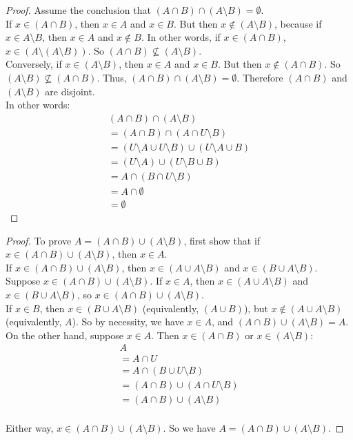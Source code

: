 \documentclass[12pt]{scrartcl} %
\begin{document}
\begin{proof}
Assume the conclusion that $(A \cap B) \cap (A\setminus B) = \emptyset$. \\
If $x \in (A \cap B)$, then $x \in A$ and $x \in B$. But then $x \notin (A \setminus B)$, because if $x \in A \setminus B$, then $x \in A$ and $x \notin B$. In other words, if $x \in (A \cap B)$, $x \in (A \setminus (A \setminus B))$. So $(A \cap B) \nsubseteq (A \setminus B)$. \\
Conversely, if $x \in (A\setminus B)$, then $x \in A$ and $x \in B$. But then $x \notin (A \cap B)$. So $(A\setminus B) \nsubseteq (A \cap B)$. Thus, $(A \cap B) \cap (A\setminus B) = \emptyset$. Therefore $(A \cap B)$ and  $(A\setminus B)$ are disjoint. \\
In other words:
\begin{align}
(A \cap B) \cap (A\setminus B) \\
= (A \cap B) \cap (A \cap U\setminus B) \\
= (U\setminus A \cup U\setminus B) \cup (U\setminus A \cup B) \\
= (U\setminus A) \cup (U\setminus B \cup B) \\
= A \cap (B \cap U\setminus B) \\
= A \cap \emptyset \\
= \emptyset
\end{align}
\end{proof}
\begin{proof}
To prove  $A = (A \cap B) \cup (A \setminus B)$, first show that if $x \in (A \cap B) \cup (A\setminus B)$, then $x \in A$. \\
If $x \in (A \cap B) \cup (A\setminus B)$, then $x \in (A \cup A\setminus B)$ and $x \in (B \cup A\setminus B)$. Suppose $x \in (A \cap B) \cup (A\setminus B)$.
If $x \in A$, then $x \in (A \cup A\setminus B)$ and $x \in (B \cup A\setminus B)$, so $x \in (A \cap B) \cup (A\setminus B)$. \\If $x \in B$, then $x \in (B \cup A\setminus B)$ (equivalently, $(A \cup B)$), but $x \notin (A \cup A\setminus B)$ (equivalently, $A$). So by necessity, we have $x \in A$, and $(A \cap B) \cup (A\setminus B) = A$. \\

On the other hand, suppose $x \in A$. Then $x \in (A \cap B)$ or $x \in (A\setminus B)$:
\begin{align}
A\\
= A \cap U \\
= A \cap (B \cup U\setminus B) \\
= (A \cap B) \cup (A \cap U\setminus B) \\
= (A \cap B) \cup (A\setminus B)
\end{align}
\\Either way, $x \in (A \cap B) \cup (A \setminus B)$. So we have $A = (A \cap B) \cup (A \setminus B)$.

\end{proof}
\end{document}
